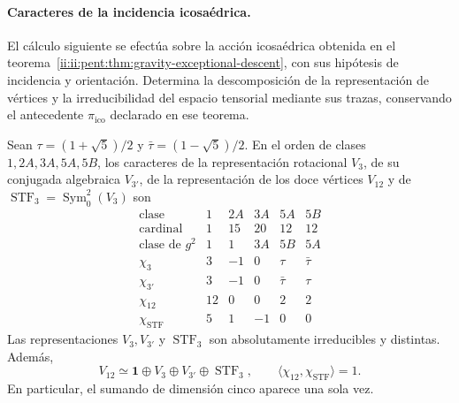 \paragraph{Caracteres de la incidencia icosaédrica.}
El cálculo siguiente se efectúa sobre la acción icosaédrica obtenida en el
teorema~\ref{ii:ii:pent:thm:gravity-exceptional-descent}, con sus hipótesis
de incidencia y orientación. Determina la descomposición de la
representación de vértices y la irreducibilidad del espacio tensorial
mediante sus trazas, conservando el antecedente
\(\pi_{\mathrm{ico}}\) declarado en ese teorema.

\begin{proposition}
\label{ii:prop:ii-pent-caracteres}
Sean \(\tau=(1+\sqrt5)/2\) y
\(\bar\tau=(1-\sqrt5)/2\). En el orden de clases
\(1,2A,3A,5A,5B\), los caracteres de la representación rotacional
\(V_3\), de su conjugada algebraica \(V_{3'}\), de la representación
de los doce vértices \(V_{12}\) y de
\(\operatorname{STF}_3=\operatorname{Sym}^2_0(V_3)\) son
\begin{equation}
\label{ii:eq:ii-pent-tabla-caracteres}
\begin{array}{c|rrrrr}
\text{clase} &1&2A&3A&5A&5B\\ \hline
\text{cardinal}&1&15&20&12&12\\
\text{clase de }g^2&1&1&3A&5B&5A\\ \hline
\chi_3&3&-1&0&\tau&\bar\tau\\
\chi_{3'}&3&-1&0&\bar\tau&\tau\\
\chi_{12}&12&0&0&2&2\\
\chi_{\mathrm{STF}}&5&1&-1&0&0
\end{array}
\end{equation}
Las representaciones \(V_3,V_{3'}\) y
\(\operatorname{STF}_3\) son absolutamente irreducibles y distintas.
Además,
\begin{equation}
\label{ii:eq:ii-pent-descomposicion-demostrada}
 V_{12}\simeq\mathbf1\oplus V_3\oplus V_{3'}
                  \oplus\operatorname{STF}_3,
 \qquad
 \langle\chi_{12},\chi_{\mathrm{STF}}\rangle=1.
\end{equation}
En particular, el sumando de dimensión cinco aparece una sola vez.
\end{proposition}

